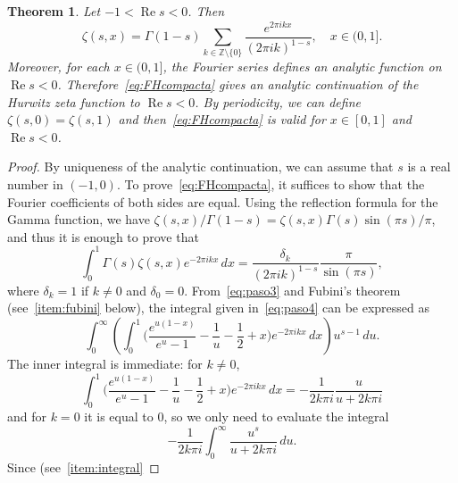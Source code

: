 \documentclass[11pt,a4paper,reqno]{amsart}
\newcommand{\Z}{\mathbb{Z}}
\renewcommand{\Re}{\operatorname{Re}}
\theoremstyle{plain}
\newtheorem{theorem}{Theorem}%
\theoremstyle{remark}
\numberwithin{equation}{section}
\begin{document}
\begin{theorem}
\label{theo:Hurwitzformula}
Let $-1<\Re s<0$. Then
\begin{equation}
\label{eq:FHcompacta}
  \zeta(s,x) = \Gamma(1-s) \sum_{k\in\Z\setminus\{0\}} \frac{e^{2\pi ikx}}{(2\pi ik)^{1-s}},
  \quad x\in (0,1].
\end{equation}
Moreover, for each $x\in (0,1]$, the Fourier series defines an analytic function on $\Re s<0$. Therefore~\eqref{eq:FHcompacta} gives an analytic continuation of the Hurwitz zeta function to $\Re s<0$. By periodicity, we can define $\zeta(s,0)=\zeta(s,1)$ and then~\eqref{eq:FHcompacta} is valid for $x\in[0,1]$ and $\Re s<0$.
\end{theorem}

\begin{proof}
By uniqueness of the analytic continuation, we can assume that $s$ is a real number in $(-1,0)$. To prove~\eqref{eq:FHcompacta}, it suffices to show that the Fourier coefficients of both sides are equal. Using the reflection formula for the Gamma function, we have $\zeta(s,x)/\Gamma(1-s) = \zeta(s,x)\Gamma(s)\sin(\pi s)/\pi$, and thus it is enough to prove that
\begin{equation}
\label{eq:paso4}
  \int_0^1 \Gamma(s) \zeta(s,x) e^{-2\pi ikx} \,dx
  = \frac{\delta_k}{(2\pi ik)^{1-s}} \frac{\pi}{\sin(\pi s)},
\end{equation}
where $\delta_k=1$ if $k\not=0$ and $\delta_0=0$.
From~\eqref{eq:paso3} and Fubini's theorem (see~\ref{item:fubini}
below), the integral given in~\eqref{eq:paso4} can be expressed as
\begin{equation*}
  \int_0^\infty \left(\int_0^1 \biggl( \frac{e^{u(1-x)}}{e^u-1}-\frac{1}{u}-\frac{1}{2}+x \biggr)
  e^{-2\pi ikx}\,dx \right) u^{s-1}\,du.
\end{equation*}
The inner integral is immediate: for $k \neq 0$,
\begin{equation*}
  \int_0^1 \biggl(\frac{e^{u(1-x)}}{e^u-1} - \frac{1}{u}-\frac{1}{2}+x\biggr) e^{-2\pi ikx} \,dx
  = -\frac{1}{2k\pi i}\frac{u}{u+2k\pi i}
\end{equation*}
and for $k = 0$ it is equal to $0$, so we only need to evaluate the integral
\begin{equation*}
  -\frac{1}{2k\pi i} \int_0^\infty \frac{u^s}{u+2k\pi i}\,du.
\end{equation*}
Since (see~\ref{item:integral}

\end{proof}
\end{document}
